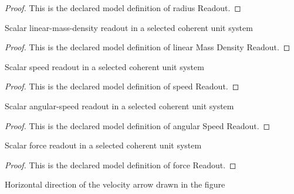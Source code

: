 \begin{proof}
  This is the declared model definition of radius Readout.
\end{proof}
\begin{definition}
  \label{def:physics:phyx-mini-0244:phyxminiproblems-problemphyxmini0244-linearmassdensityreadout}
  Scalar linear-mass-density readout in a selected coherent unit system
\end{definition}
\begin{proof}
  This is the declared model definition of linear Mass Density Readout.
\end{proof}
\begin{definition}
  \label{def:physics:phyx-mini-0244:phyxminiproblems-problemphyxmini0244-speedreadout}
  Scalar speed readout in a selected coherent unit system
\end{definition}
\begin{proof}
  This is the declared model definition of speed Readout.
\end{proof}
\begin{definition}
  \label{def:physics:phyx-mini-0244:phyxminiproblems-problemphyxmini0244-angularspeedreadout}
  Scalar angular-speed readout in a selected coherent unit system
\end{definition}
\begin{proof}
  This is the declared model definition of angular Speed Readout.
\end{proof}
\begin{definition}
  \label{def:physics:phyx-mini-0244:phyxminiproblems-problemphyxmini0244-forcereadout}
  Scalar force readout in a selected coherent unit system
\end{definition}
\begin{proof}
  This is the declared model definition of force Readout.
\end{proof}
\begin{definition}
  \label{def:physics:phyx-mini-0244:phyxminiproblems-problemphyxmini0244-horizontaldirection}
  Horizontal direction of the velocity arrow drawn in the figure
\end{definition}
